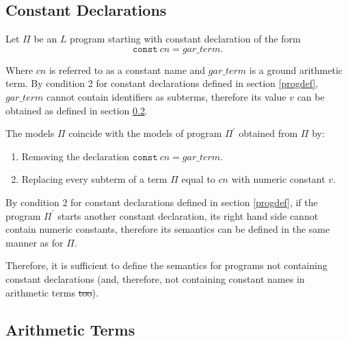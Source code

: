 \documentclass[a4paper,10pt]{article}
\providecommand{\DIFaddtex}[1]{{\protect\color{blue}\uwave{#1}}} %
\providecommand{\DIFdeltex}[1]{{\protect\color{red}\sout{#1}}}                      %
\providecommand{\DIFaddbegin}{} %
\providecommand{\DIFaddend}{} %
\providecommand{\DIFdelbegin}{} %
\providecommand{\DIFdelend}{} %
\providecommand{\DIFadd}[1]{\texorpdfstring{\DIFaddtex{#1}}{#1}} %
\providecommand{\DIFdel}[1]{\texorpdfstring{\DIFdeltex{#1}}{}} %
\begin{document}
\subsection{Constant Declarations} \label{constants}


Let $\Pi$ be an $L$ program starting with \DIFaddbegin \DIFadd{a }\DIFaddend constant declaration of the form
$$\texttt{const} ~cn = gar\_term.$$

Where $cn$ is referred to as a constant name and $gar\_term$ is a ground arithmetic term.
By condition 2 for constant declarations defined in section \ref{progdef}, $gar\_term$ cannot contain identifiers as subterms,
therefore its value $v$ can be obtained as defined in section \ref{at}. 

The models $\Pi$ coincide with the models of program $\Pi^\prime$ obtained from $\Pi$ by:
\begin{enumerate}
\item Removing the declaration $\texttt{const}~cn = gar\_term.$
\item Replacing every subterm of a term \DIFaddbegin \DIFadd{in }\DIFaddend $\Pi$ equal to $cn$ with \DIFaddbegin \DIFadd{the }\DIFaddend numeric constant $v$. 
\end{enumerate} 


\medskip\noindent
By condition 2 for constant declarations defined in section \ref{progdef}, if the program $\Pi^\prime$ starts another constant declaration, its right hand side cannot contain numeric constants, therefore its semantics can be defined in the same manner as for $\Pi$.

\medskip\noindent
Therefore, it is sufficient to define the semantics for programs not containing constant declarations (and, therefore, not containing constant names in arithmetic terms \DIFdelbegin \DIFdel{too}\DIFdelend \DIFaddbegin \DIFadd{either}\DIFaddend ).

\subsection{Arithmetic Terms}\label{at}
\end{document}

